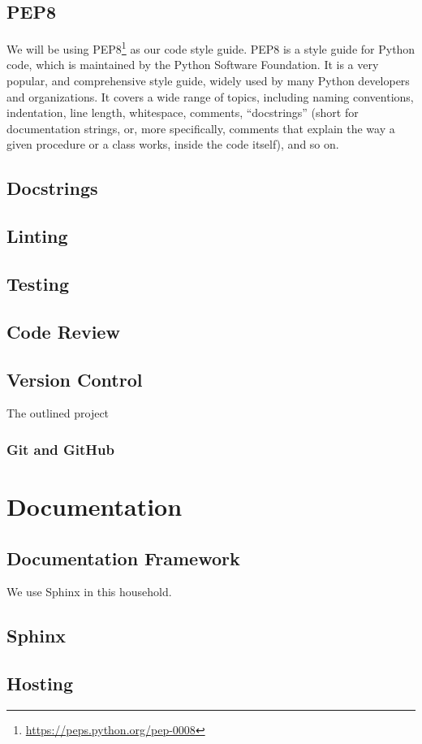 \subsection{PEP8}
We will be using PEP8\footnote{\url{https://peps.python.org/pep-0008}} \citep{pep8} as our code style guide. PEP8 is a style guide for Python code, which is maintained by the Python Software Foundation. It is a very popular, and comprehensive style guide, widely used by many Python developers and organizations. It covers a wide range of topics, including naming conventions, indentation, line length, whitespace, comments, ``docstrings'' (short for documentation strings, or, more specifically, comments that explain the way a given procedure or a class works, inside the code itself), and so on.
\subsection{Docstrings}
\subsection{Linting}
\subsection{Testing}
\subsection{Code Review}
\subsection{Version Control}
The outlined project 
\subsubsection{Git and GitHub}

\section{Documentation}
\subsection{Documentation Framework}
We use Sphinx in this household.
\subsection{Sphinx}

\subsection{Hosting}


